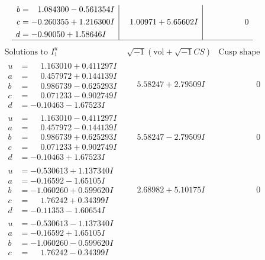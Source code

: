 \documentclass[1p]{elsarticle_modified}
\theoremstyle{definition}
\newcommand{\I}{\sqrt{-1}}
\begin{document}
$$\begin{array}{c|c|c}
\begin{aligned}
b &= \phantom{-}1.084300 - 0.561354 I \\
c &= -0.260355 + 1.216300 I \\
d &= -0.90050 + 1.58646 I\end{aligned}
 & \phantom{-}1.00971 + 5.65602 I & \phantom{-0.000000 } 0\\
 \hline 
 \end{array}$$\newpage$$\begin{array}{c|c|c}  
\text{Solutions to }I^u_{1}& \I (\text{vol} + \sqrt{-1}CS) & \text{Cusp shape}\\
 \hline 
\begin{aligned}
u &= \phantom{-}1.163010 + 0.411297 I \\
a &= \phantom{-}0.457972 + 0.144139 I \\
b &= \phantom{-}0.986739 - 0.625293 I \\
c &= \phantom{-}0.071233 - 0.902749 I \\
d &= -0.10463 - 1.67523 I\end{aligned}
 & \phantom{-}5.58247 + 2.79509 I & \phantom{-0.000000 } 0 \\ \hline\begin{aligned}
u &= \phantom{-}1.163010 - 0.411297 I \\
a &= \phantom{-}0.457972 - 0.144139 I \\
b &= \phantom{-}0.986739 + 0.625293 I \\
c &= \phantom{-}0.071233 + 0.902749 I \\
d &= -0.10463 + 1.67523 I\end{aligned}
 & \phantom{-}5.58247 - 2.79509 I & \phantom{-0.000000 } 0 \\ \hline\begin{aligned}
u &= -0.530613 + 1.137340 I \\
a &= -0.16592 - 1.65105 I \\
b &= -1.060260 + 0.599620 I \\
c &= \phantom{-}1.76242 + 0.34399 I \\
d &= -0.11353 - 1.60654 I\end{aligned}
 & \phantom{-}2.68982 + 5.10175 I & \phantom{-0.000000 } 0 \\ \hline\begin{aligned}
u &= -0.530613 - 1.137340 I \\
a &= -0.16592 + 1.65105 I \\
b &= -1.060260 - 0.599620 I \\
c &= \phantom{-}1.76242 - 0.34399 I \\

\end{aligned}
\end{array}$$
\end{document}
